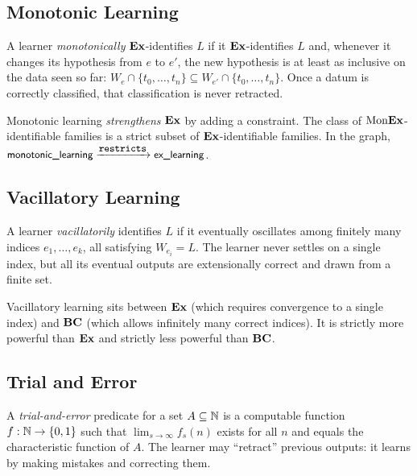 \subsection{Monotonic Learning}
\label{sec:monotonic}

\begin{defn}
\label{def:monotonic}
A learner \emph{monotonically} $\mathbf{Ex}$-identifies $L$ if it $\mathbf{Ex}$-identifies $L$ and, whenever it changes its hypothesis from $e$ to $e'$, the new hypothesis is at least as inclusive on the data seen so far: $W_e \cap \{t_0, \ldots, t_n\} \subseteq W_{e'} \cap \{t_0, \ldots, t_n\}$. Once a datum is correctly classified, that classification is never retracted.
\end{defn}

Monotonic learning \emph{strengthens} $\mathbf{Ex}$ by adding a constraint. The class of $\mathrm{Mon}\mathbf{Ex}$-identifiable families is a strict subset of $\mathbf{Ex}$-identifiable families. In the graph, $\textsf{\small monotonic\_learning} \xrightarrow{\texttt{\small restricts}} \textsf{\small ex\_learning}$.

\subsection{Vacillatory Learning}
\label{sec:vacillatory}

\begin{defn}
\label{def:vacillatory}
A learner \emph{vacillatorily} identifies $L$ if it eventually oscillates among finitely many indices $e_1, \ldots, e_k$, all satisfying $W_{e_i} = L$. The learner never settles on a single index, but all its eventual outputs are extensionally correct and drawn from a finite set.
\end{defn}

Vacillatory learning sits between $\mathbf{Ex}$ (which requires convergence to a single index) and $\mathbf{BC}$ (which allows infinitely many correct indices). It is strictly more powerful than $\mathbf{Ex}$ and strictly less powerful than $\mathbf{BC}$.

\subsection{Trial and Error}
\label{sec:trial-error}

\begin{defn}
\label{def:trial-error}
A \emph{trial-and-error} predicate for a set $A \subseteq \mathbb{N}$ is a computable function $f : \mathbb{N} \to \{0, 1\}$ such that $\lim_{s \to \infty} f_s(n)$ exists for all $n$ and equals the characteristic function of $A$. The learner may ``retract'' previous outputs: it learns by making mistakes and correcting them.
\end{defn}

